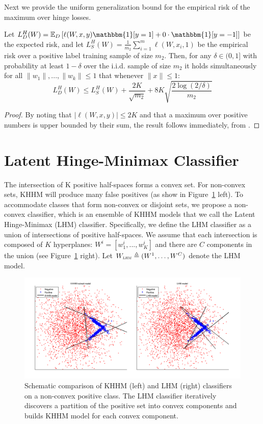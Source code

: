 \documentclass[twoside,11pt]{article}
\newcommand{\wl}{W_{\textsc{\textsc{\relsize{-2}{\textsl{LHM}}}}}}
\begin{document}
Next we provide the uniform generalization bound for the empirical risk of the maximum over hinge losses.
\begin{theorem}\label{th_10}
Let  $L_D^{H}(W)=\mathbb{E}_D\left[\ell(W,x,y)\mathbbm{1}[y=1]+0\cdot \mathbbm{1}[y=-1]\right]$ be the expected risk, and let  $L_S^{H}(W) = \frac{1}{m_2}\sum_{i=1}^m \ell(W,x_i,1)$ be the empirical risk over a positive label training sample of size $m_2$. Then, for any $\delta \in (0,1]$ with probability at least $1-\delta$ over the i.i.d. sample of size $m_2$ it holds simultaneously for all  $\|w_1\|,..., \|w_k\| \le 1$ that whenever $\|x\|  \le 1$:
$$L_D^{H}(W) \le  L_S^{H}(W) + \frac{2K}{\sqrt{m_2}} + 8K\sqrt{\frac{2 \log(2/\delta)}{m_2}}$$
\end{theorem}
\begin{proof}
By noting that $|\ell(W,x,y)| \leq 2K$ and that a maximum over positive numbers is upper bounded by their sum, the result follows immediately, from \cite{Bartlett03}.
\end{proof}

%
\section{Latent Hinge-Minimax Classifier}\label{sec:LHM}
The intersection of K positive half-spaces forms a convex set. For non-convex sets, KHHM will produce many false positives (as show in Figure~\ref{fig:khhm_vs_lhm} left). To accommodate classes that form non-convex or disjoint sets, we propose a non-convex classifier, which is an ensemble of KHHM models that we call the Latent Hinge-Minimax (LHM) classifier. Specifically, we define the LHM classifier as a union of intersections of positive half-spaces. We assume that each intersection is composed of $K$ hyperplanes: $W^i=[w^i_1,...,w^i_K]$ and there are $C$ components in the union (see Figure~\ref{fig:khhm_vs_lhm} right). Let $\wl \triangleq (W^1,\dots,W^C)$ denote the LHM model. %
\begin{figure}
\center
  \includegraphics[width=0.8\linewidth]{LHM_vs_KHHM.png}
  \caption{Schematic comparison of KHHM (left) and LHM (right) classifiers on a non-convex positive class. The LHM classifier iteratively discovers a partition of the positive set into convex components and builds KHHM model for each convex component.}\label{fig:khhm_vs_lhm}
  \end{figure}
\end{document}

